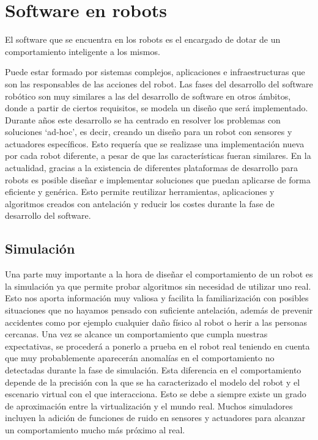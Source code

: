 \section{Software en robots}\label{SEC:Software en robots}

El software que se encuentra en los robots es el encargado de dotar de un comportamiento inteligente a los mismos. 

Puede estar formado por sistemas complejos, aplicaciones e infraestructuras que son las responsables de las acciones del robot. Las fases del desarrollo del software robótico son muy similares a las del desarrollo de software en otros ámbitos, donde a partir de ciertos requisitos, se modela un diseño que será implementado. Durante años este desarrollo se ha centrado en resolver los problemas con soluciones \textquoteleft ad-hoc\textquoteright, es decir, creando un diseño para un robot con sensores y actuadores específicos. Esto requería que se realizase una implementación nueva por cada robot diferente, a pesar de que las características fueran similares. En la actualidad, gracias a la existencia de diferentes plataformas de desarrollo para robots es posible diseñar e implementar soluciones que puedan aplicarse de forma eficiente y genérica. Esto permite reutilizar herramientas, aplicaciones y algoritmos creados con antelación y reducir los costes durante la fase de desarrollo del software.


\subsection{Simulación}\label{SEC:Simulacion}

Una parte muy importante a la hora de diseñar el comportamiento de un robot es la simulación ya que permite probar algoritmos sin necesidad de utilizar uno real. Esto nos aporta información muy valiosa y facilita la familiarización con posibles situaciones que no hayamos pensado con suficiente antelación, además de prevenir accidentes como por ejemplo cualquier daño físico al robot o herir a las personas cercanas. Una vez se alcance un comportamiento que cumpla nuestras expectativas, se procederá a ponerlo a prueba en el robot real teniendo en cuenta que muy probablemente aparecerán anomalías en el comportamiento no detectadas durante la fase de simulación. Esta diferencia en el comportamiento depende de la precisión con la que se ha caracterizado el modelo del robot y el escenario virtual con el que interacciona. Esto se debe a siempre existe un grado de aproximación entre la virtualización y el mundo real. Muchos simuladores incluyen la adición de funciones de ruido en sensores y actuadores para alcanzar un comportamiento mucho más próximo al real.


